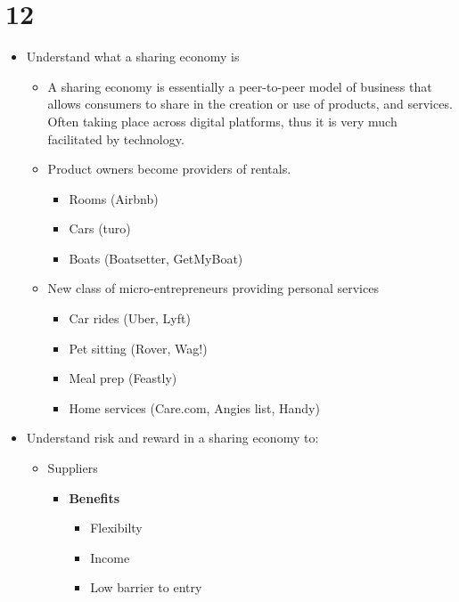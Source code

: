 \documentclass{report}
\begin{document}
\chapter*{12}
\begin{itemize}
    \item Understand what a sharing economy is
        \begin{itemize}[label=$\circ$]
            \item A sharing economy is essentially a peer-to-peer model of business that allows consumers to share in the creation or use of products, and services. Often taking place across digital platforms, thus it is very much facilitated by technology.
            \item Product owners become providers of rentals.
                \begin{itemize}[label=$\circ$]
                    \item Rooms (Airbnb)
                    \item Cars (turo)
                    \item Boats (Boatsetter, GetMyBoat)
                \end{itemize}
            \item New class of micro-entrepreneurs providing personal services
                \begin{itemize}[label=$\circ$]
                    \item Car rides (Uber, Lyft)
                    \item Pet sitting (Rover, Wag!)
                    \item Meal prep (Feastly)
                    \item Home services (Care.com, Angies list, Handy)
                \end{itemize}
        \end{itemize}
    \item Understand risk and reward in a sharing economy to:
        \begin{itemize}[label=$\circ$]
            \item Suppliers
                \begin{itemize}
                    \item \textbf{Benefits}
                        \begin{itemize}[label=$\circ$]
                            \item Flexibilty
                            \item Income
                            \item Low barrier to entry

\end{itemize}
\end{itemize}
\end{itemize}
\end{itemize}
\end{document}
